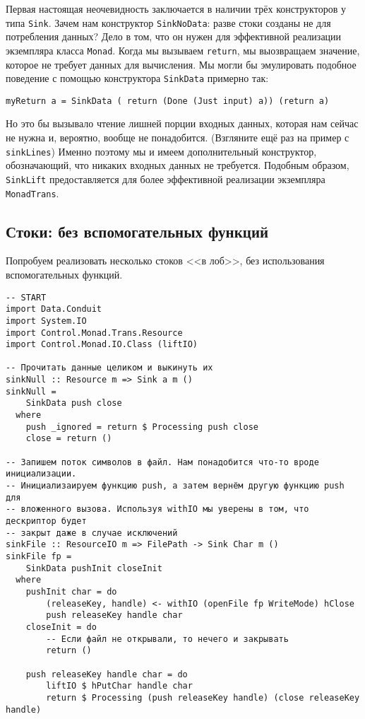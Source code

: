 {Первая настоящая неочевидность заключается в наличии трёх конструкторов у
типа \lstinline=Sink=. Зачем нам конструктор \lstinline=SinkNoData=: разве стоки
созданы не для потребления данных? Дело в том, что он нужен для эффективной реализации 
экземпляра класса \lstinline=Monad=. Когда мы вызываем \lstinline=return=, мы
выозвращаем значение, которое не требует данных для вычисления. Мы могли бы эмулировать
подобное поведение с помощью конструктора \lstinline=SinkData= примерно так:
\begin{lstlisting}
myReturn a = SinkData ( return (Done (Just input) a)) (return a)
\end{lstlisting}
Но это бы вызывало чтение лишней порции входных данных, которая нам сейчас не нужна и,
вероятно, вообще не понадобится. (Взгляните ещё раз на пример с \lstinline=sinkLines=)
Именно поэтому мы и имеем дополнительный конструктор, обозначающий, что никаких входных данных не требуется.
Подобным образом, \lstinline=SinkLift= предоставляется для более эффективной реализации
экземпляра \lstinline=MonadTrans=.

\subsection{Стоки: без вспомогательных функций}
Попробуем реализовать несколько стоков <<в лоб>>, без использования вспомогательных функций.
\begin{lstlisting}
-- START
import Data.Conduit
import System.IO
import Control.Monad.Trans.Resource
import Control.Monad.IO.Class (liftIO)

-- Прочитать данные целиком и выкинуть их
sinkNull :: Resource m => Sink a m ()
sinkNull =
    SinkData push close
  where
    push _ignored = return $ Processing push close
    close = return ()

-- Запишем поток символов в файл. Нам понадобится что-то вроде инициализации.
-- Инициализаируем функцию push, а затем вернём другую функцию push для 
-- вложенного вызова. Используя withIO мы уверены в том, что дескриптор будет 
-- закрыт даже в случае исключений
sinkFile :: ResourceIO m => FilePath -> Sink Char m ()
sinkFile fp =
    SinkData pushInit closeInit
  where
    pushInit char = do
        (releaseKey, handle) <- withIO (openFile fp WriteMode) hClose
        push releaseKey handle char
    closeInit = do
        -- Если файл не открывали, то нечего и закрывать
        return ()

    push releaseKey handle char = do
        liftIO $ hPutChar handle char
        return $ Processing (push releaseKey handle) (close releaseKey handle)


\end{lstlisting}}
